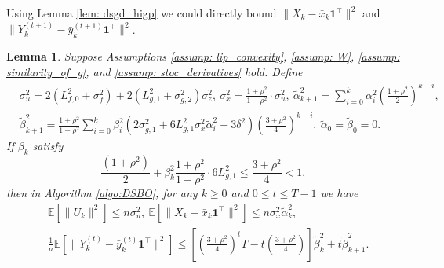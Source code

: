 \documentclass{article}
\theoremstyle{plain}
\newtheorem{lemma}[theorem]{Lemma}
\theoremstyle{definition}
\theoremstyle{remark}
\newcommand{\E}{\mathbb{E}}
\newcommand{\bfonet}{\mathbf{1}^{\top}}
\begin{document}
Using Lemma \ref{lem: dsgd_higp} we could directly bound $\|X_k - \bar{x}_k\bfonet\|^2$ and $\|Y_k^{(t+1)} - \bar{y}_k^{(t+1)}\bfonet\|^2$.
\begin{lemma}\label{lem: XY_cons}
    Suppose Assumptions \ref{assump: lip_convexity}, \ref{assump: W}, \ref{assump: similarity_of_g}, and \ref{assump: stoc_derivatives} hold. Define
    \begin{align*}
        &\sigma_u^2 = 2(L_{f,0}^2 + \sigma_f^2) + 2(L_{g,1}^2 + \sigma_{g,2}^2)\sigma_z^2,\ \sigma_x^2 = \frac{1+\rho^2}{1-\rho^2}\cdot \sigma_u^2,\ \tilde{\alpha}_{k+1}^2 = \sum_{i=0}^{k}\alpha_i^2\left(\frac{1+\rho^2}{2}\right)^{k-i}, \\
        &\tilde{\beta}_{k+1}^2 = \frac{1+\rho^2}{1-\rho^2}\sum_{i=0}^{k}\beta_i^2(2\sigma_{g,1}^2 + 6L_{g,1}^2\sigma_x^2\tilde{\alpha}_i^2 + 3\delta^2)\left(\frac{3+\rho^2}{4}\right)^{k-i},\ \tilde{\alpha}_0 = \tilde{\beta}_0 = 0.
    \end{align*}
    If $\beta_k$ satisfy
    \begin{equation}\label{ineq: beta_condition}
        \frac{(1+\rho^2)}{2} + \beta_k^2\frac{1+\rho^2}{1-\rho^2}\cdot 6L_{g,1}^2 \leq \frac{3+\rho^2}{4}<1,
    \end{equation}
    then in Algorithm \ref{algo:DSBO}, for any $k\geq 0$ and $0\leq t\leq T-1$ we have
    \begin{equation}\label{ineq: XY_consensus}
        \begin{aligned}
            &\E\left[\|U_k\|^2\right]\leq n\sigma_u^2,\ \E\left[\|X_k - \bar{x}_k\bfonet\|^2\right]\leq n\sigma_x^2\tilde{\alpha}_k^2, \\ 
            &\frac{1}{n}\E\left[\|Y_{k}^{(t)} - \bar{y}_{k}^{(t)}\bfonet\|^2\right]\leq \left[\left(\frac{3+\rho^2}{4}\right)^{t}T - t\left(\frac{3+\rho^2}{4}\right)\right]\tilde{\beta}_k^2 + t\tilde{\beta}_{k+1}^2.
        \end{aligned}
    \end{equation}
\end{lemma}
\end{document}
